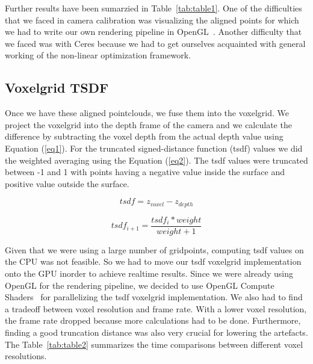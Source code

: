 \documentclass[10pt,twocolumn,letterpaper]{article}
\begin{document}
Further results have been sumarzied in Table~\ref{tab:table1}. One of the difficulties that we faced in camera calibration was visualizing the aligned points for which we had to write our own rendering pipeline in OpenGL~\cite{Authors3}. Another difficulty that we faced was with Ceres because we had to get ourselves acquainted with general working of the non-linear optimization framework. 
\subsection{Voxelgrid TSDF}
Once we have these aligned pointclouds, we fuse them into the voxelgrid. We project the voxelgrid into the depth frame of the camera and we calculate the difference by subtracting the voxel depth from the actual depth value using Equation (\ref{eq1}). For the truncated signed-distance function (tsdf) values we did the weighted averaging using the Equation (\ref{eq2}). The tsdf values were truncated between -1 and 1 with points having a negative value inside the surface and positive value outside the surface.

\begin{equation}\label{eq1}
tsdf=z_{voxel} - z_{depth}
\end{equation}

\begin{equation}\label{eq2}
tsdf_{i+1}=\frac{tsdf_{i} * weight}{weight+1}
\end{equation}

Given that we were using a large number of gridpoints, computing tsdf values on the CPU was not feasible. So we had to move our tsdf voxelgrid implementation onto the GPU inorder to achieve realtime results. Since we were already using OpenGL for the rendering pipeline, we decided to use OpenGL Compute Shaders~\cite{Authors1} for parallelizing the tsdf voxelgrid implementation. We also had to find a tradeoff between voxel resolution and frame rate. With a lower voxel resolution, the frame rate dropped because more calculations had to be done. Furthermore, finding a good truncation distance was also very crucial for lowering the artefacts. The Table~\ref{tab:table2} summarizes the time comparisons between different voxel resolutions.
\end{document}
